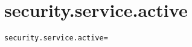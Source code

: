 \section{security.service.active}
\label{configuration:SecurityServiceActive}
\AvailableInCsharpOnly{\TODO}
\begin{lstlisting}[style=Props,caption={Usage example for \textit{security.service.active}}]
security.service.active=
\end{lstlisting}